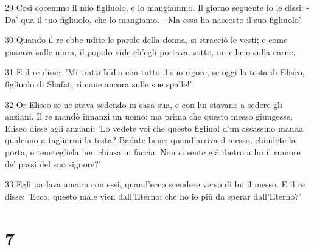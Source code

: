 \par 29 Così cocemmo il mio figliuolo, e lo mangiammo. Il giorno seguente io le dissi: - Da' qua il tuo figliuolo, che lo mangiamo. - Ma essa ha nascosto il suo figliuolo'.
\par 30 Quando il re ebbe udite le parole della donna, si stracciò le vesti; e come passava sulle mura, il popolo vide ch'egli portava, sotto, un cilicio sulla carne.
\par 31 E il re disse: 'Mi tratti Iddio con tutto il suo rigore, se oggi la testa di Eliseo, figliuolo di Shafat, rimane ancora sulle sue spalle!'
\par 32 Or Eliseo se ne stava sedendo in casa sua, e con lui stavano a sedere gli anziani. Il re mandò innanzi un uomo; ma prima che questo messo giungesse, Eliseo disse agli anziani: 'Lo vedete voi che questo figliuol d'un assassino manda qualcuno a tagliarmi la testa? Badate bene; quand'arriva il messo, chiudete la porta, e tenetegliela ben chiusa in faccia. Non si sente già dietro a lui il rumore de' passi del suo signore?'
\par 33 Egli parlava ancora con essi, quand'ecco scendere verso di lui il messo. E il re disse: 'Ecco, questo male vien dall'Eterno; che ho io più da sperar dall'Eterno?'

\chapter{7}

